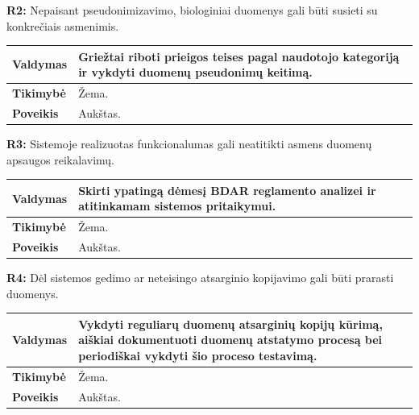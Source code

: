 \documentclass[12pt]{article}
\begin{document}
\noindent \textbf{R2:} Nepaisant pseudonimizavimo, biologiniai duomenys gali
būti susieti su konkrečiais asmenimis.

\label{sec:R2}
\begin{table}[htb!]
    \captionsetup{justification=centering}
    \vskip -10pt
    \begin{tabular}{|m{3cm}|m{13.7cm}|}
        \hline
        \raggedleft \textbf{\cellcolor{deepchampagne}Valdymas} &
        Griežtai riboti prieigos teises pagal naudotojo kategoriją ir vykdyti
        duomenų pseudonimų keitimą. \\
        \hline
        \raggedleft \textbf{\cellcolor{deepchampagne}Tikimybė} & Žema. \\
        \hline
        \raggedleft \textbf{\cellcolor{deepchampagne}Poveikis} & Aukštas. \\
        \hline
    \end{tabular}
\end{table}

\noindent \textbf{R3:} Sistemoje realizuotas funkcionalumas gali neatitikti
asmens duomenų apsaugos reikalavimų.

\label{sec:R3}
\begin{table}[htb!]
    \captionsetup{justification=centering}
    \vskip -10pt
    \begin{tabular}{|m{3cm}|m{13.7cm}|}
        \hline
        \raggedleft \textbf{\cellcolor{deepchampagne}Valdymas} &
        Skirti ypatingą dėmesį BDAR reglamento analizei ir atitinkamam sistemos
        pritaikymui. \\
        \hline
        \raggedleft \textbf{\cellcolor{deepchampagne}Tikimybė} & Žema. \\
        \hline
        \raggedleft \textbf{\cellcolor{deepchampagne}Poveikis} & Aukštas. \\
        \hline
    \end{tabular}
\end{table}

\noindent \textbf{R4:} Dėl sistemos gedimo ar neteisingo atsarginio kopijavimo
gali būti prarasti duomenys.

\label{sec:R4}
\begin{table}[htb!]
    \captionsetup{justification=centering}
    \vskip -10pt
    \begin{tabular}{|m{3cm}|m{13.7cm}|}
        \hline
        \raggedleft \textbf{\cellcolor{deepchampagne}Valdymas} &
        Vykdyti reguliarų duomenų atsarginių kopijų kūrimą, aiškiai dokumentuoti
        duomenų atstatymo procesą bei periodiškai vykdyti šio proceso
        testavimą. \\
        \hline
        \raggedleft \textbf{\cellcolor{deepchampagne}Tikimybė} & Žema. \\
        \hline
        \raggedleft \textbf{\cellcolor{deepchampagne}Poveikis} & Aukštas. \\
        \hline
    \end{tabular}
\end{table}
\end{document}
